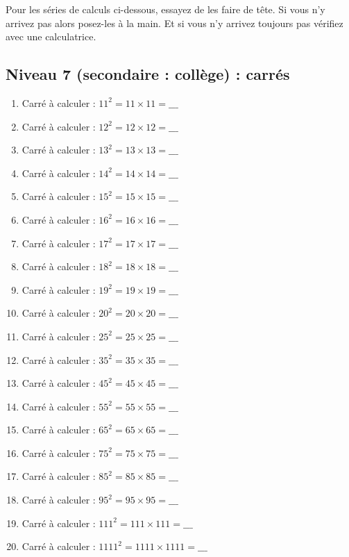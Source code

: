 \documentclass[11pt]{article}
\begin{document}
Pour les séries de calculs ci-dessous, essayez de les faire de
tête. Si vous n'y arrivez pas alors posez-les à la main. Et si vous
n'y arrivez toujours pas vérifiez avec une calculatrice.


\newpage

\subsection{Niveau 7 (secondaire : collège) : carrés}
\label{sec:org863b8a8}


\label{org5c96425}


\begin{enumerate}
\item Carré à calculer :  \(11^2 = 11 \times 11 =  \_\_\_\)
\item Carré à calculer :  \(12^2 = 12 \times 12 = \_\_\_\)
\item Carré à calculer :  \(13^2 = 13 \times 13 = \_\_\_\)
\item Carré à calculer :  \(14^2 = 14 \times 14 = \_\_\_\)
\item Carré à calculer :  \(15^2 = 15 \times 15 = \_\_\_\)
\item Carré à calculer :  \(16^2 = 16 \times 16 = \_\_\_\)
\item Carré à calculer :  \(17^2 = 17 \times 17 = \_\_\_\)
\item Carré à calculer :  \(18^2 = 18 \times 18 = \_\_\_\)
\item Carré à calculer :  \(19^2 = 19 \times 19 = \_\_\_\)
\item Carré à calculer :  \(20^2 = 20 \times 20 = \_\_\_\)
\item Carré à calculer :  \(25^2 = 25 \times 25 =  \_\_\_\)
\item Carré à calculer :  \(35^2 = 35 \times 35 = \_\_\_\)
\item Carré à calculer :  \(45^2 = 45 \times 45 = \_\_\_\)
\item Carré à calculer :  \(55^2 = 55 \times 55 = \_\_\_\)
\item Carré à calculer :  \(65^2 = 65 \times 65 = \_\_\_\)
\item Carré à calculer :  \(75^2 = 75 \times 75 = \_\_\_\)
\item Carré à calculer :  \(85^2 = 85 \times 85 = \_\_\_\)
\item Carré à calculer :  \(95^2 = 95 \times 95 = \_\_\_\)
\item Carré à calculer :  \(111^2 = 111 \times 111 = \_\_\_\)
\item Carré à calculer :  \(1111^2 = 1111 \times 1111 = \_\_\_\)
\end{enumerate}
\end{document}
